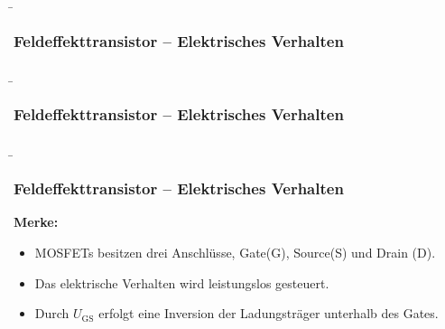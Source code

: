 \begin{frame}
    \b{ \frametitle{Feldeffekttransistor -- Elektrisches Verhalten}
        \begin{figure}[H]
            \centering
            
        \end{figure}
    }
\end{frame}

\begin{frame}
    \b{ \frametitle{Feldeffekttransistor -- Elektrisches Verhalten}
        \begin{figure}[H]
            \centering
            
        \end{figure}
    }
\end{frame}

\begin{frame}
    \b{\frametitle{Feldeffekttransistor -- Elektrisches Verhalten}
        \textbf{Merke:}
        \begin{itemize}
            \item MOSFETs besitzen drei Anschlüsse, Gate(G), Source(S) und Drain (D).
            \item Das elektrische Verhalten wird leistungslos gesteuert.
            \item Durch $U_\mathrm{GS}$ erfolgt eine Inversion der Ladungsträger unterhalb des Gates.
        \end{itemize}
        }
\end{frame}

